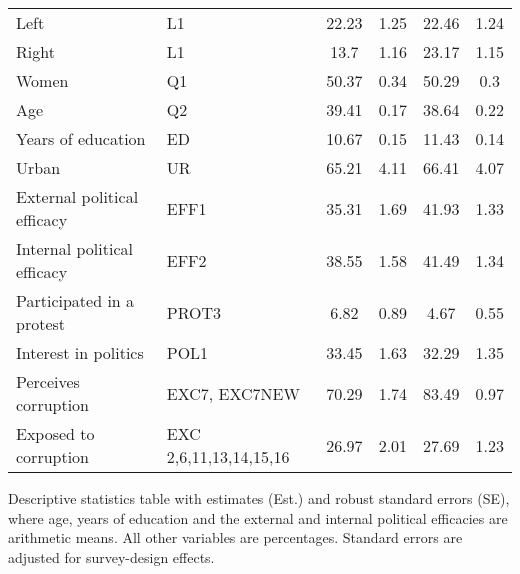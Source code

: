 \documentclass[12pt,a4]{article}
\begin{document}
\begin{table}[htbp!]
\begin{center}
\begin{tabular}{llcccc}
Left                                          & L1                                                                                      & 22.23    & 1.25           & 22.46    & 1.24           \\
Right                                         & L1                                                                                      & 13.7     & 1.16           & 23.17    & 1.15           \\
Women                                         & Q1                                                                                      & 50.37    & 0.34           & 50.29    & 0.3            \\
Age                                           & Q2                                                                                      & 39.41    & 0.17           & 38.64    & 0.22           \\
Years of education                            & ED                                                                                      & 10.67    & 0.15           & 11.43    & 0.14           \\
Urban                                         & UR                                                                                      & 65.21    & 4.11           & 66.41    & 4.07           \\
External political efficacy                   & EFF1                                                                                    & 35.31    & 1.69           & 41.93    & 1.33           \\
Internal political efficacy                   & EFF2                                                                                    & 38.55    & 1.58           & 41.49    & 1.34           \\
Participated in a protest                     & PROT3                                                                                   & 6.82     & 0.89           & 4.67     & 0.55           \\
Interest in politics & POL1 & 33.45 & 1.63 & 32.29 & 1.35 \\
Perceives corruption                          & EXC7, EXC7NEW                                                                           & 70.29    & 1.74           & 83.49    & 0.97           \\
Exposed to corruption                         & EXC 2,6,11,13,14,15,16                                                                  & 26.97    & 2.01           & 27.69    & 1.23           \\ 
\bottomrule
\end{tabular}
\end{center}
Descriptive statistics table with estimates (Est.) and robust standard errors (SE), where age, years of education and the external and internal political efficacies are arithmetic means. All other variables are percentages. Standard errors are adjusted for survey-design effects.
\end{table}
\end{document}
